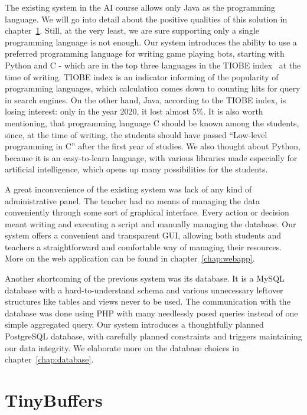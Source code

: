 The existing system in the AI course allows only Java as the programming language. We will go into detail about the positive qualities of this solution in chapter~\ref{chap:tinybuffers}. Still, at the very least, we are sure supporting only a single programming language is not enough. Our system introduces the ability to use a preferred programming language for writing game playing bots, starting with Python and C - which are in the top three languages in the TIOBE index~\cite{tiobe} at the time of writing. TIOBE index is an indicator informing of the popularity of programming languages, which calculation comes down to counting hits for query in search engines. On the other hand, Java, according to the TIOBE index, is losing interest: only in the year 2020, it lost almost 5\%. It is also worth mentioning, that programming language C should be known among the students, since, at the time of writing, the students should have passed ``Low-level programming in C'' after the first year of studies. We also thought about Python, because it is an easy-to-learn language, with various libraries made especially for artificial intelligence, which opens up many possibilities for the students.

A great inconvenience of the existing system was lack of any kind of administrative panel. The teacher had no means of managing the data conveniently through some sort of graphical interface. Every action or decision meant writing and executing a script and manually managing the database. Our system offers a convenient and transparent GUI, allowing both students and teachers a straightforward and comfortable way of managing their resources. More on the web application can be found in chapter~\ref{chap:webapp}.

Another shortcoming of the previous system was its database. It is a MySQL database with a hard-to-understand schema and various unnecessary leftover structures like tables and views never to be used. The communication with the database was done using PHP with many needlessly posed queries instead of one simple aggregated query. Our system introduces a thoughtfully planned PostgreSQL database, with carefully planned constraints and triggers maintaining our data integrity. We elaborate more on the database choices in chapter~\ref{chap:database}. 

\chapter{TinyBuffers}
\label{chap:tinybuffers}


